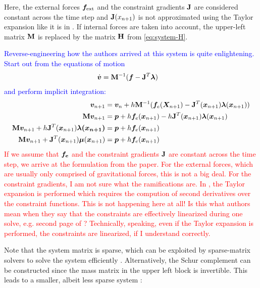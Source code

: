 Here, the external forces $\bm{f}_{\text{ext}}$ and the constraint gradients $\mathbf{J}$ are considered constant across the time step 
and $\mathbf{J}(x_{n+1})$ 
is not approximated using the Taylor expansion like it is in \cite{baraff1998}. If internal forces are taken into account, the upper-left 
matrix $\mathbf{M}$ is replaced by the matrix $\mathbf{H}$ from \autoref{eq:system-H}.

\textcolor{blue}{Reverse-engineering how the authors arrived at this system is quite enlightening. Start out from the equations of motion 
\cite{ascher1995}
    \begin{align*}
        \dot{\bm{v}} &= \mathbf{M}^{-1}(\bm{f} - \mathbf{J}^T \bm{\lambda})
    \end{align*}
    and perform implicit integration:
    \begin{align*}
        \bm{v}_{n+1} &= \bm{v}_n + h\mathbf{M}^{-1}(\bm{f}_e(\bm{X}_{n+1}) - \mathbf{J}^T(\bm{x}_{n+1}) \bm{\lambda}(\bm{x}_{n+1})) \\
        \mathbf{M}\bm{v}_{n+1} &= \bm{p} + h\bm{f}_e(\bm{x}_{n+1}) - h\mathbf{J}^T(\bm{x}_{n+1})\bm{\lambda}(\bm{x}_{n+1}) \\
        \mathbf{M}\bm{v}_{n+1} + h \mathbf{J}^T(\bm{x}_{n+1})\bm{\lambda(\bm{x}_{n+1})} &= \bm{p} + h\bm{f}_e(\bm{x}_{n+1}) \\
        \mathbf{M}\bm{v}_{n+1} + \mathbf{J}^T(\bm{x}_{n+1}) \bm{\mu}(\bm{x}_{n+1}) &= \bm{p} + h\bm{f}_e(\bm{x}_{n+1})
    \end{align*}
}
\textcolor{red}{If we assume that $\bm{f_e}$ and the constraint gradients $\mathbf{J}$ are constant across the time step, we arrive at the 
formulation from the paper. For the external forces, which are usually only comprised of gravitational forces, this is not a big 
deal. For the constraint gradients, I am not sure what the ramifications are. In \cite{baraff1998}, the Taylor expansion is performed
which requires the compution of second derivatives over the constraint functions. This is not happening here at all! Is this what 
authors mean when they say that the constraints are effectively linearized during one solve, e.g. second page 
of \cite{mueller2020}? Technically, speaking, even if the Taylor expansion is performed, the constraints are linearized, if I 
understand correctly.}

Note that the system matrix is sparse, which can be exploited by sparse-matrix solvers to solve the system efficiently
\cite{baraff1996}. Alternatively, the Schur complement can be constructed since the mass matrix in the upper left block is invertible.
This leads to a smaller, albeit less sparse system \cite{tournier2015}:

